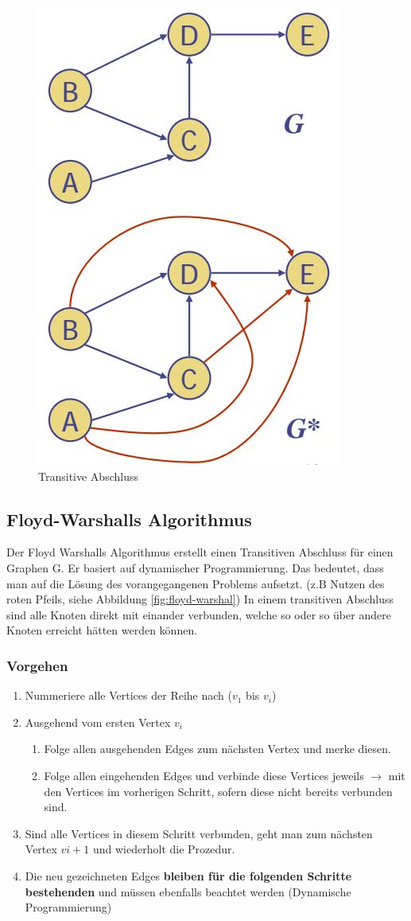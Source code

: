 \begin{figure}[h]
	\centering
	\includegraphics[width=0.3\linewidth]{images/transitive_abschluss}
	\caption{Transitive Abschluss}
	\label{fig:transitiveabschluss}
\end{figure}

\clearpage

\subsection{Floyd-Warshalls Algorithmus}
Der Floyd Warshalls Algorithmus erstellt einen Transitiven Abschluss für einen Graphen G. Er basiert auf dynamischer Programmierung. Das bedeutet, dass man auf die Lösung des vorangegangenen Problems aufsetzt. (z.B Nutzen des roten Pfeils, siehe Abbildung \ref{fig:floyd-warshal}) In einem transitiven Abschluss sind alle Knoten direkt mit einander verbunden, welche so oder so über andere Knoten erreicht hätten werden können.

\subsubsection{Vorgehen}
\begin{enumerate}
	\item Nummeriere alle Vertices der Reihe nach ($v_1$ bis $v_i$)
	\item Ausgehend vom ersten Vertex $v_i$ 
	\begin{enumerate}
		\item Folge allen ausgehenden Edges zum nächsten Vertex und merke diesen.
		\item Folge allen eingehenden Edges und verbinde diese Vertices jeweils $\rightarrow$ mit den Vertices im vorherigen Schritt, sofern diese nicht bereits verbunden sind.
	\end{enumerate}
	\item Sind alle Vertices in diesem Schritt verbunden, geht man zum nächsten Vertex $v{i+1}$ und wiederholt die Prozedur. 
	\item Die neu gezeichneten Edges \textbf{bleiben für die folgenden Schritte bestehenden} und müssen ebenfalls beachtet werden (Dynamische Programmierung)
\end{enumerate}

